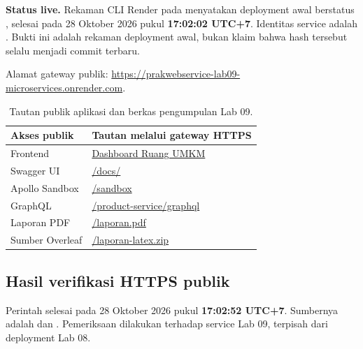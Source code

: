 \textbf{Status live.} Rekaman CLI Render pada
 menyatakan deployment
awal  berstatus , selesai pada 28 Oktober 2026
pukul \textbf{17:02:02 UTC+7}. Identitas service adalah
. Bukti ini adalah rekaman deployment awal,
bukan klaim bahwa hash tersebut selalu menjadi commit terbaru.

Alamat gateway publik:
\url{https://prakwebservice-lab09-microservices.onrender.com}.

\begin{table}[H]
\small
\begin{tabularx}{\linewidth}{@{}L{3.7cm}Y@{}}
\toprule
Akses publik & Tautan melalui gateway HTTPS \\
\midrule
Frontend & \href{https://prakwebservice-lab09-microservices.onrender.com/}{Dashboard Ruang UMKM} \\
Swagger UI & \href{https://prakwebservice-lab09-microservices.onrender.com/docs/}{/docs/} \\
Apollo Sandbox & \href{https://prakwebservice-lab09-microservices.onrender.com/sandbox}{/sandbox} \\
GraphQL & \href{https://prakwebservice-lab09-microservices.onrender.com/product-service/graphql}{/product-service/graphql} \\
Laporan PDF & \href{https://prakwebservice-lab09-microservices.onrender.com/laporan.pdf}{/laporan.pdf} \\
Sumber Overleaf & \href{https://prakwebservice-lab09-microservices.onrender.com/laporan-latex.zip}{/laporan-latex.zip} \\
\bottomrule
\end{tabularx}
\caption{Tautan publik aplikasi dan berkas pengumpulan Lab 09.}
\end{table}

\clearpage
\subsection{Hasil verifikasi HTTPS publik}
Perintah  selesai pada 28 Oktober 2026
pukul \textbf{17:02:52 UTC+7}. Sumbernya adalah
 dan
. Pemeriksaan dilakukan terhadap service Lab 09,
terpisah dari deployment Lab 08.

